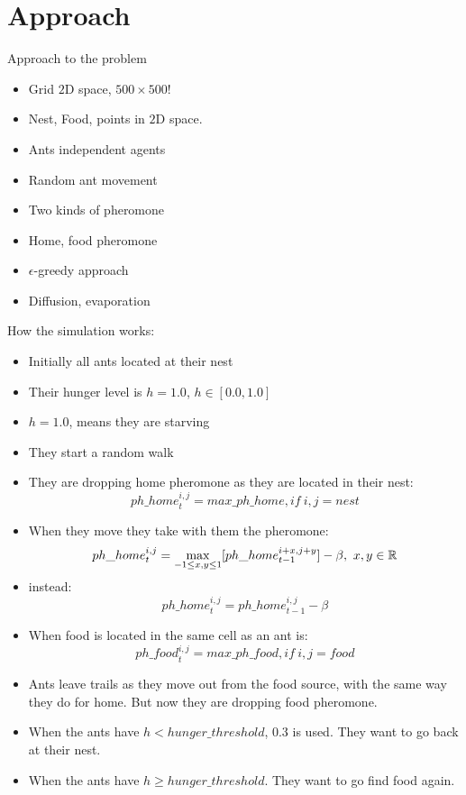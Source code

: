\documentclass{beamer}
\begin{document}
\section{Approach}
\begin{frame}
Approach to the problem
\begin{itemize}
\item Grid $2$D space, $500 \times 500 !$
\item Nest, Food, points in $2$D space.
\item Ants independent agents
\item Random ant movement
\item Two kinds of pheromone
\item Home, food pheromone
\item $\epsilon$-greedy approach
\item Diffusion, evaporation
\end{itemize}
\end{frame}

\begin{frame}[allowframebreaks]
How the simulation works:
\begin{itemize}
\item Initially all ants located at their nest
\item Their hunger level is $h = 1.0$, $h \in [0.0,1.0]$
\item $h = 1.0$, means they are starving
\item They start a random walk
\item They are dropping home pheromone as they are located in their nest:
\begin{equation}
{ph\_{home}}_t^{i,j} = max\_ph\_home, if\ i,j = nest
\end{equation}
\item When they move they take with them the pheromone:
\begin{equation}
{ph\_{home}}_t^{i,j} = \smash{\displaystyle\max_{-1 \leq x,y \leq 1}}[{ph\_{home}}_{t-1}^{i+x,j+y}] - \beta,\ x,y \in \mathbb{R}
\end{equation}
\item instead:
\begin{equation}
{ph\_{home}}_t^{i,j} = {ph\_{home}}_{t-1}^{i,j} - \beta
\end{equation}
\item When food is located in the same cell as an ant is:
\begin{equation}
{ph\_{food}}_t^{i,j} = max\_ph\_food, if\ i,j = food
\end{equation}
\item Ants leave trails as they move out from the food source, with the same way they do for home. But now they are dropping food pheromone.
\item When the ants have $h < hunger\_threshold$, $0.3$ is used. They want to go back at their nest.
\item When the ants have $h \geq hunger\_threshold$. They want to go find food again.
\end{itemize}
\end{frame}
\end{document}

